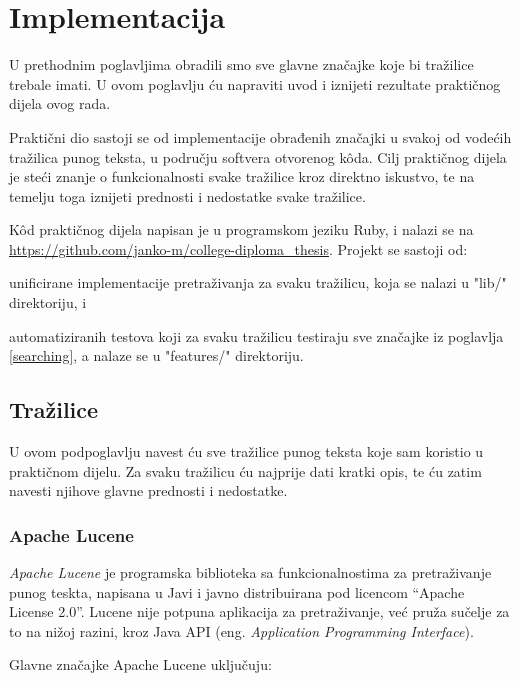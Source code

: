 \documentclass[a4paper,twoside,12pt]{scrreprt}
\begin{document}
\chapter{Implementacija}

U prethodnim poglavljima obradili smo sve glavne značajke koje bi tražilice trebale imati. U ovom poglavlju ću napraviti uvod i iznijeti rezultate praktičnog dijela ovog rada.

Praktični dio sastoji se od implementacije obrađenih značajki u svakoj od vodećih tražilica punog teksta, u području softvera otvorenog kôda. Cilj praktičnog dijela je steći znanje o funkcionalnosti svake tražilice kroz direktno iskustvo, te na temelju toga iznijeti prednosti i nedostatke svake tražilice.

Kôd praktičnog dijela napisan je u programskom jeziku Ruby, i nalazi se na \url{https://github.com/janko-m/college-diploma_thesis}. Projekt se sastoji od:

\begin{compactenum}
  \item unificirane implementacije pretraživanja za svaku tražilicu, koja se nalazi u "lib/" direktoriju, i
  \item automatiziranih testova koji za svaku tražilicu testiraju sve značajke iz poglavlja \ref{searching}, a nalaze se u "features/" direktoriju.
\end{compactenum}

\section{Tražilice}

U ovom podpoglavlju navest ću sve tražilice punog teksta koje sam koristio u praktičnom dijelu. Za svaku tražilicu ću najprije dati kratki opis, te ću zatim navesti njihove glavne prednosti i nedostatke.

\subsection{Apache Lucene}

\textit{Apache Lucene} je programska biblioteka sa funkcionalnostima za pretraživanje punog teskta, napisana u Javi i javno distribuirana pod licencom ``Apache License 2.0''. Lucene nije potpuna aplikacija za pretraživanje, već pruža sučelje za to na nižoj razini, kroz Java API (eng. \textit{Application Programming Interface}).

Glavne značajke Apache Lucene uključuju:
\end{document}
